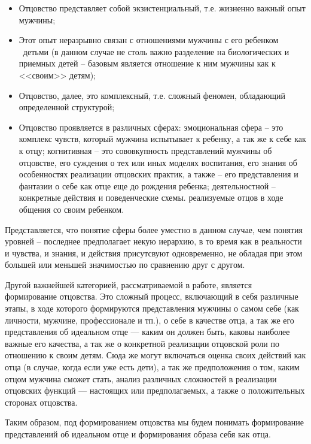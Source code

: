 \documentclass{../../common/thesisbyxetex}
\begin{document}
\begin{itemize}
	\item Отцовство представляет собой экзистенциальный, т.е. жизненно важный опыт
мужчины;
\item Этот опыт неразрывно связан с отношениями мужчины с его ребенком \ детьми (в данном случае не
столь важно разделение на биологических и приемных детей -- базовым является отношение к ним
мужчины как к <<своим>> детям);
\item Отцовство, далее, это комплексный, т.е. сложный феномен, обладающий определенной структурой;
\item Отцовство проявляется в различных сферах: эмоциональная сфера -- это комплекс чувств, который
мужчина испытывает к ребенку, а так же к себе как к отцу; когнитивная -- это сововкупность
представлений мужчины об отцовстве, его суждения о тех или иных моделях воспитания, его знания об
особенностях реализации отцовских практик, а также -- его представления и фантазии о себе как отце
еще до рождения ребенка; деятельностной -- конкретные действия и поведенческие схемы. реализуемые
отцов в ходе общения со своим ребенком.

\end{itemize}

Представляется, что понятие сферы более уместно в данном случае, чем понятия уровней -- последнее
предполагает некую иерархию, в то время как в реальности и чувства, и знания, и действия
присутсвуют одновременно, не обладая при этом большей или меньшей значимостью по сравнению друг с
другом.

Другой важнейшей категорией, рассматриваемой в работе, является формирование отцовства. Это сложный
процесс, включающий в себя различные этапы, в ходе которого формируются
представления мужчины о самом себе (как личности, мужчине,
профессионале и тп.), о себе в качестве отца, а так же его представления об идеальном отце ---
каким он должен быть, каковы наиболее
важные его качества, а так же о конкретной реализации отцовской роли по отношению к своим детям.
Сюда же могут
включаться оценка своих действий как отца (в случае, когда если уже есть дети), а так же
предположения о том, каким отцом мужчина сможет стать, анализ различных
сложностей в реализации отцовских функций --- настоящих или предполагаемых, а также о положительных
сторонах отцовства.

Таким образом, под формированием отцовства мы будем понимать  формирование представлений об
идеальном отце и формирования образа себя как отца.
\end{document}
